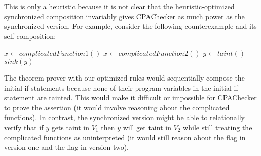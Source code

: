 \documentclass{article}
\begin{document}
	This is only a heuristic because it is not clear that the heuristic-optimized synchronized composition invariably gives CPAChecker as much power as the synchronized version. For example, consider the following counterexample and its self-composition:

	\begin{algorithm}[H]
		\begin{algorithmic}
			    \State $x \gets complicatedFunction1()$
			\Else
			    \State $x \gets complicatedFunction2()$
			\EndIf
				\State $y \gets taint()$
			\EndIf
			\State $sink(y)$
		\end{algorithmic}
	\end{algorithm}

	The theorem prover with our optimized rules would sequentially compose the initial if-statements because none of their program variables in the initial if statement are tainted. This would make it difficult or impossible for CPAChecker to prove the assertion (it would involve reasoning about the complicated functions). In contrast, the synchronized version might be able to relationally verify that if $y$ gets taint in $V_1$ then $y$ will get taint in $V_2$ while still treating the complicated functions as uninterpreted (it would still reason about the flag in version one and the flag in version two). %
\end{document}
